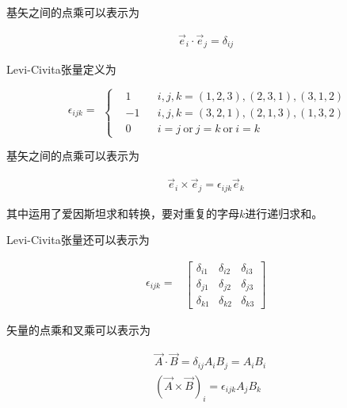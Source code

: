 基矢之间的点乘可以表示为

\begin{equation*}
  \begin{aligned}
    \vec{e}_i \cdot \vec{e}_j = \delta_{ij}
  \end{aligned}
\end{equation*}

Levi-Civita张量定义为

\begin{equation*}
  \begin{aligned}
    \epsilon_{ijk} = 
  \end{aligned}
  \left\{
  \begin{aligned}
    & 1 && i,j,k=(1,2,3), (2,3,1),(3,1,2) \\
    & -1 && i,j,k=(3,2,1),(2,1,3),(1,3,2) \\
    & 0 && i=j\ \text{or}\ j = k \ \text{or}\ i=k
  \end{aligned}
  \right.
\end{equation*}

基矢之间的点乘可以表示为

\begin{equation*}
  \begin{aligned}
    \vec{e}_i \times \vec{e}_j = \epsilon_{ijk} \vec{e}_k
  \end{aligned}
\end{equation*}

其中运用了爱因斯坦求和转换，要对重复的字母$k$进行递归求和。

Levi-Civita张量还可以表示为

\begin{equation*}
  \begin{aligned}
    \epsilon_{ijk} = 
  \end{aligned}
  \begin{aligned}
    \left[
      \begin{array}{ccc}
       \delta_{i1} & \delta_{i2} & \delta_{i3}\\
       \delta_{j1} & \delta_{j2} & \delta_{j3}\\
       \delta_{k1} & \delta_{k2} & \delta_{k3}
      \end{array}
    \right ]
  \end{aligned}
\end{equation*}

矢量的点乘和叉乘可以表示为

\begin{equation*}
  \begin{aligned}
    & \vec{A} \cdot \vec{B} = \delta_{ij} A_i B_j = A_iB_i \\
    & \left( \vec{A} \times \vec{B} \right)_i = \epsilon_{ijk} A_j B_k
  \end{aligned}
\end{equation*}

